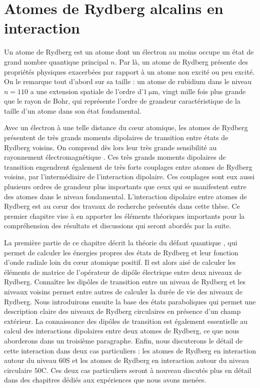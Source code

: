 \chapter{Atomes de Rydberg alcalins en interaction}
\label{chapter:Rydberg}
\vfill
\minitoc
\newpage

\noindent Un atome de Rydberg est un atome dont un électron au moins occupe un état de grand nombre quantique principal $n$.
Par là, un atome de Rydberg présente des propriétés physiques exacerbées par rapport à un atome non excité ou peu excité.
On le remarque tout d'abord sur sa taille : un atome de rubidium dans le niveau $n=110$ a une extension spatiale de l'ordre d'$1 ~\si{\micro\meter}$, vingt mille fois plus grande que le rayon de Bohr, qui représente l'ordre de grandeur caractéristique de la taille d'un atome dans son état fondamental.

Avec un électron à une telle distance du c\oe ur atomique, les atomes de Rydberg présentent de très grands moments dipolaires de transition entre états de Rydberg voisins. On comprend dès lors leur très grande sensibilité au rayonnement électromagnétique \cite{ENS_ENHANCED}.
Ces très grands moments dipolaires de transition engendrent également de très forts couplages entre atomes de Rydberg voisins, par l'intermédiaire de l'interaction dipolaire. Ces couplages sont eux aussi plusieurs ordres de grandeur plus importants que ceux qui se manifestent entre des atomes dans le niveau fondamental.
L'interaction dipolaire entre atomes de Rydberg est au c\oe ur des travaux de recherche présentés dans cette thèse. Ce premier chapitre vise à en apporter les éléments théoriques importants pour la compréhension des résultats et discussions qui seront abordés par la suite.

La première partie de ce chapitre décrit la théorie du défaut quantique \cite{TXT_GALLAGHER}, qui permet de calculer les énergies propres des états de Rydberg et leur fonction d'onde radiale loin du c\oe ur atomique positif.
Il est alors aisé de calculer les éléments de matrice de l'opérateur de dipôle électrique entre deux niveaux de Rydberg.
Connaître les dipôles de transition entre un niveau de Rydberg et les niveaux voisins permet entre autres de calculer la durée de vie des niveaux de Rydberg.
Nous introduirons ensuite la base des états paraboliques qui permet une description claire des niveaux de Rydberg circulaires en présence d'un champ extérieur.
La connaissance des dipôles de transition est également essentielle au calcul des interactions dipolaires entre deux atomes de Rydberg, ce que nous aborderons dans un troisième paragraphe.
Enfin, nous discuterons le détail de cette interaction dans deux cas particuliers  : les atomes de Rydberg en interaction autour du niveau $60$S et les atomes de Rydberg en interaction autour du niveau circulaire $50$C.
Ces deux cas particuliers seront à nouveau discutés plus en détail dans des chapitres dédiés aux expériences que nous avons menées.

